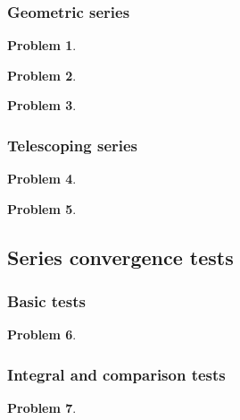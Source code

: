 \documentclass{article}
\newtheorem{problem}{Problem}
\begin{document}
\subsubsection{Geometric series}
\begin{problem}

\end{problem}
\begin{problem}

\end{problem}
\begin{problem}

\end{problem}

\subsubsection{Telescoping series}
\begin{problem}

\end{problem}

\begin{problem}

\end{problem}



\subsection{Series convergence tests}
\subsubsection{Basic tests}
\begin{problem}

\end{problem}



\subsubsection{Integral and comparison tests}

\begin{problem}

\end{problem}

\end{document}
